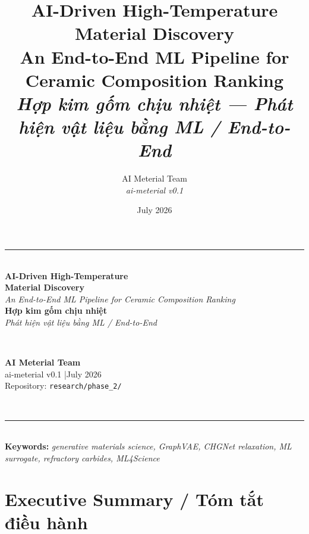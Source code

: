 \documentclass[11pt,a4paper]{report}
\title{\textbf{AI-Driven High-Temperature Material Discovery} \\[6pt]
  \large An End-to-End ML Pipeline for Ceramic Composition Ranking \\[2pt]
  \large \textit{Hợp kim gốm chịu nhiệt — Phát hiện vật liệu bằng ML / End-to-End}}
\author{AI Meterial Team \\ \textit{ai-meterial v0.1}}
\date{July 2026}
\begin{document}
\begin{titlepage}
\centering
\vspace*{1.5cm}
{\color{aiBlue}\rule{\linewidth}{1.5pt}}\\[0.5cm]
{\Huge\bfseries\color{aiBlue} AI-Driven High-Temperature \\[2pt]
  Material Discovery}\\[0.4cm]
{\large \textit{An End-to-End ML Pipeline for Ceramic Composition Ranking}}\\[1.2cm]
{\large\color{aiOrange} \textbf{Hợp kim gốm chịu nhiệt}}\\
{\large\color{aiOrange} \textit{Phát hiện vật liệu bằng ML / End-to-End}}\\[1.5cm]

\\[1.5cm]

\begin{minipage}{0.75\textwidth}
\centering
\textbf{AI Meterial Team} \\
\small ai-meterial v0.1 \quad|\quad July 2026 \\
\small Repository: \texttt{research/phase\_2/}
\end{minipage}\\[2cm]

{\color{aiBlue}\rule{\linewidth}{1.5pt}}\\[0.3cm]
\small\textbf{Keywords:} \textit{generative materials science, GraphVAE, CHGNet relaxation, ML surrogate, refractory carbides, ML4Science}
\vspace{1.5cm}
\end{titlepage}

\tableofcontents
\listoffigures
\listoftables
\newpage

\chapter*{Executive Summary / Tóm tắt điều hành}
\end{document}
